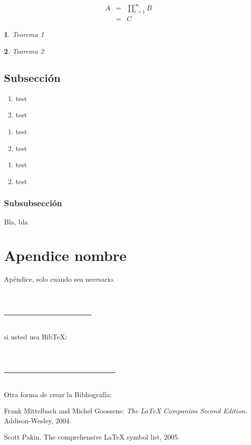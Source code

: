 \documentclass[4p,times]{matua-article}
\theoremstyle{plain}
\newtheorem{thm}{\protect\theoremname}
\providecommand{\theoremname}{Teorema}
\begin{document}
\begin{eqnarray}
A & = & \prod_{i=1}^{\infty}B\nonumber \\
 & = & C
\end{eqnarray}

\begin{thm}
Teorema 1
\end{thm}

\begin{thm}
Teorema 2
\end{thm}

\subsection{Subsección}
\begin{enumerate}
\item test
\item test
\end{enumerate}


\renewcommand{\labelenumi}{(\roman{enumi})} 
\begin{enumerate}
\item test
\item test
\end{enumerate}
\renewcommand{\labelenumi}{Step\,\alph{enumi})} 
\begin{enumerate}
\item test
\item test
\end{enumerate}

\subsubsection{Subsubsección}

Bla, bla

\appendix

\section{Apendice nombre}

Apéndice, solo cuando sea necesario.


\section*{-----------------}

si usted usa Bib\TeX{}:






\section*{---------------------}

\noindent Otra forma de crear la Bibliografía:
\begin{thebibliography}{1}
Frank Mittelbach and Michel Goossens: \emph{The \LaTeX{}
Companion Second Edition.} Addison-Wesley, 2004.

Scott Pakin. The comprehensive \LaTeX{} symbol list,
2005.\end{thebibliography}
\end{document}
